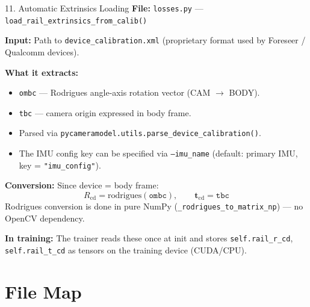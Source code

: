 \documentclass[aspectratio=169, 12pt]{beamer}
\newcommand{\Rcd}{R_{\mathrm{cd}}}
\newcommand{\tcd}{\mathbf{t}_{\mathrm{cd}}}
\begin{document}
\begin{frame}{11. Automatic Extrinsics Loading}
\small
\textbf{File:} \texttt{losses.py} --- \texttt{load\_rail\_extrinsics\_from\_calib()}

\medskip
\textbf{Input:} Path to \texttt{device\_calibration.xml} (proprietary format used
by Foreseer / Qualcomm devices).

\medskip
\textbf{What it extracts:}
\begin{itemize}\setlength{\itemsep}{2pt}
    \item \texttt{ombc} --- Rodrigues angle-axis rotation vector (CAM $\to$ BODY).
    \item \texttt{tbc} --- camera origin expressed in body frame.
    \item Parsed via \texttt{pycameramodel.utils.parse\_device\_calibration()}.
    \item The IMU config key can be specified via \texttt{--imu\_name}
          (default: primary IMU, key = \texttt{"imu\_config"}).
\end{itemize}

\medskip
\textbf{Conversion:}
Since device = body frame:
\[
    \Rcd = \mathrm{rodrigues}(\texttt{ombc}), \qquad \tcd = \texttt{tbc}
\]
Rodrigues conversion is done in pure NumPy (\texttt{\_rodrigues\_to\_matrix\_np})
--- no OpenCV dependency.

\medskip
\textbf{In training:} The trainer reads these once at init and stores
\texttt{self.rail\_r\_cd}, \texttt{self.rail\_t\_cd} as tensors on the
training device (CUDA/CPU).
\end{frame}


\section{File Map}
\end{document}

